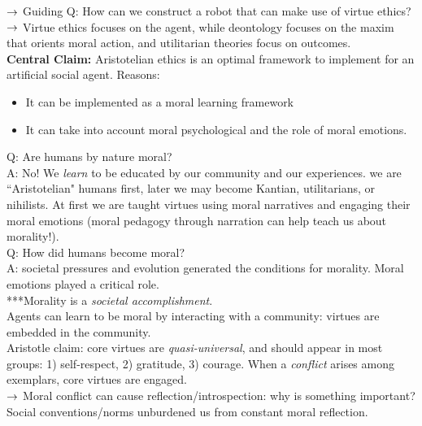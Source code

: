 $\rightarrow$ Guiding Q: How can we construct a robot that can make use of virtue ethics? \\

$\rightarrow$ Virtue ethics focuses on the agent, while deontology focuses on the maxim that orients moral action, and utilitarian theories focus on outcomes. \\

{\bf Central Claim:} Aristotelian ethics is an optimal framework to implement for an artificial social agent. Reasons:
\begin{itemize}
	\item It can be implemented as a moral learning framework
	\item It can take into account moral psychological and the role of moral emotions.
\end{itemize}

Q: Are humans by nature moral? \\
A: No! We {\it learn} to be educated by our community and our experiences. we are ``Aristotelian" humans first, later we may become Kantian, utilitarians, or nihilists. At first we are taught virtues using moral narratives and engaging their moral emotions (moral pedagogy through narration can help teach us about morality!). \\

Q: How did humans become moral? \\

A: societal pressures and evolution generated the conditions for morality. Moral emotions played a critical role. \\

***Morality is a {\it societal accomplishment}. \\

Agents can learn to be moral by interacting with a community: virtues are embedded in the community. \\

Aristotle claim: core virtues are {\it quasi-universal}, and should appear in most groups: 1) self-respect, 2) gratitude, 3) courage. When a {\it conflict} arises among exemplars, core virtues are engaged. \\

$\rightarrow$ Moral conflict can cause reflection/introspection: why is something important? Social conventions/norms unburdened us from constant moral reflection. \\

